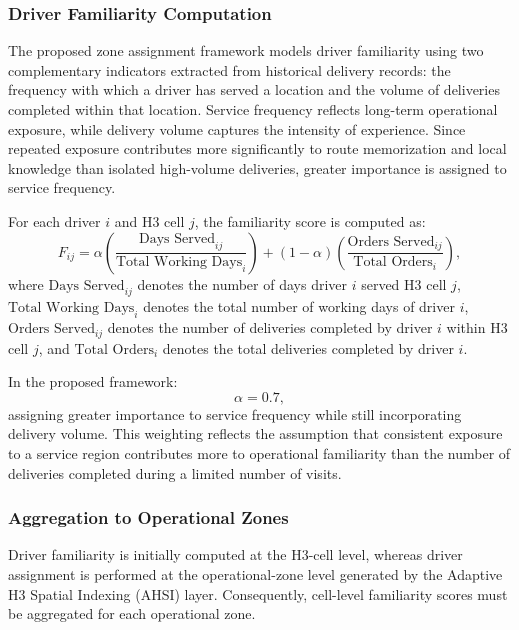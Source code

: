 \documentclass{article}
\begin{document}
\subsubsection{Driver Familiarity Computation}
The proposed zone assignment framework models driver familiarity using two complementary indicators extracted from historical delivery records: the frequency with which a driver has served a location and the volume of deliveries completed within that location. Service frequency reflects long-term operational exposure, while delivery volume captures the intensity of experience. Since repeated exposure contributes more significantly to route memorization and local knowledge than isolated high-volume deliveries, greater importance is assigned to service frequency.

For each driver $i$ and H3 cell $j$, the familiarity score is computed as:
\begin{equation}
F_{ij} = \alpha \left( \frac{\text{Days Served}_{ij}}{\text{Total Working Days}_i} \right) + (1-\alpha) \left( \frac{\text{Orders Served}_{ij}}{\text{Total Orders}_i} \right),
\end{equation}
where $\text{Days Served}_{ij}$ denotes the number of days driver $i$ served H3 cell $j$, $\text{Total Working Days}_i$ denotes the total number of working days of driver $i$, $\text{Orders Served}_{ij}$ denotes the number of deliveries completed by driver $i$ within H3 cell $j$, and $\text{Total Orders}_i$ denotes the total deliveries completed by driver $i$.

In the proposed framework:
\begin{equation}
\alpha = 0.7,
\end{equation}
assigning greater importance to service frequency while still incorporating delivery volume. This weighting reflects the assumption that consistent exposure to a service region contributes more to operational familiarity than the number of deliveries completed during a limited number of visits.

\subsubsection{Aggregation to Operational Zones}
Driver familiarity is initially computed at the H3-cell level, whereas driver assignment is performed at the operational-zone level generated by the Adaptive H3 Spatial Indexing (AHSI) layer. Consequently, cell-level familiarity scores must be aggregated for each operational zone.
\end{document}
